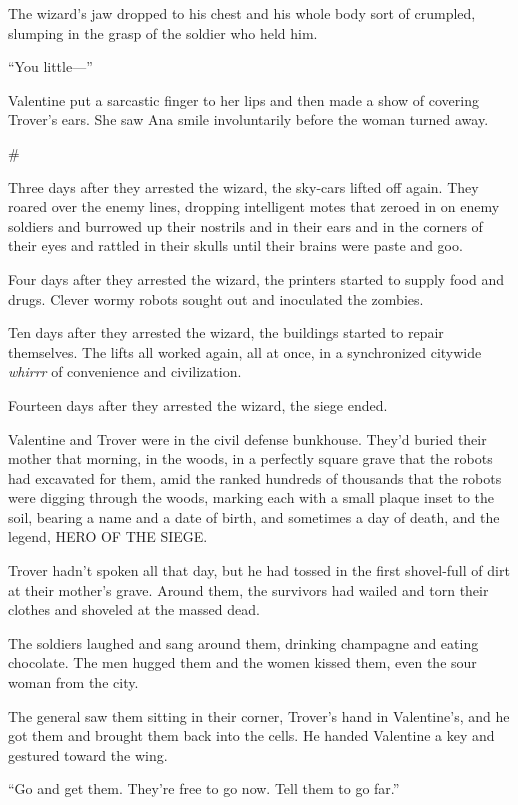The wizard’s jaw dropped to his chest and his whole body sort of
crumpled, slumping in the grasp of the soldier who held him.

“You little—”

Valentine put a sarcastic finger to her lips and then made a show
of covering Trover’s ears. She saw Ana smile involuntarily before
the woman turned away.

\#

Three days after they arrested the wizard, the sky-cars lifted off
again. They roared over the enemy lines, dropping intelligent motes
that zeroed in on enemy soldiers and burrowed up their nostrils and
in their ears and in the corners of their eyes and rattled in their
skulls until their brains were paste and goo.

Four days after they arrested the wizard, the printers started to
supply food and drugs. Clever wormy robots sought out and
inoculated the zombies.

Ten days after they arrested the wizard, the buildings started to
repair themselves. The lifts all worked again, all at once, in a
synchronized citywide \emph{whirrr} of convenience and
civilization.

Fourteen days after they arrested the wizard, the siege ended.

Valentine and Trover were in the civil defense bunkhouse. They’d
buried their mother that morning, in the woods, in a perfectly
square grave that the robots had excavated for them, amid the
ranked hundreds of thousands that the robots were digging through
the woods, marking each with a small plaque inset to the soil,
bearing a name and a date of birth, and sometimes a day of death,
and the legend, HERO OF THE SIEGE.

Trover hadn’t spoken all that day, but he had tossed in the first
shovel-full of dirt at their mother’s grave. Around them, the
survivors had wailed and torn their clothes and shoveled at the
massed dead.

The soldiers laughed and sang around them, drinking champagne and
eating chocolate. The men hugged them and the women kissed them,
even the sour woman from the city.

The general saw them sitting in their corner, Trover’s hand in
Valentine’s, and he got them and brought them back into the cells.
He handed Valentine a key and gestured toward the wing.

“Go and get them. They’re free to go now. Tell them to go far.”

